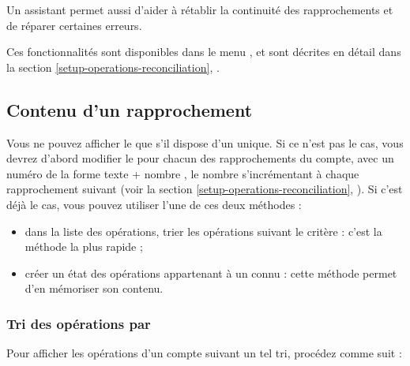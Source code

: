 Un assistant permet aussi d'aider à rétablir la continuité des rapprochements et de réparer certaines erreurs.

Ces fonctionnalités sont disponibles dans le menu , et sont décrites en détail dans la section \vref{setup-operations-reconciliation}, .


\subsection{Contenu d'un rapprochement\label{reconciliation-manage-content}}

Vous ne pouvez afficher le  que s'il dispose d'un  unique. Si ce n'est pas le cas, vous devrez d'abord modifier le  pour chacun des rapprochements du compte, avec un numéro de la forme \og texte + nombre \fg{}, le nombre s'incrémentant à chaque rapprochement suivant (voir la section \vref{setup-operations-reconciliation}, ). Si c'est déjà le cas, vous pouvez utiliser l'une de ces deux méthodes :

\begin{itemize}
	\item dans la liste des opérations, trier les opérations suivant le critère  : c'est la méthode la plus rapide ;
	\item créer un état des opérations appartenant à un  connu :  cette méthode permet d'en mémoriser son contenu.
\end{itemize}


\subsubsection{Tri des opérations par \label{reconciliation-manage-content-sort}}

Pour afficher les opérations d'un compte suivant un tel tri, procédez comme suit :

